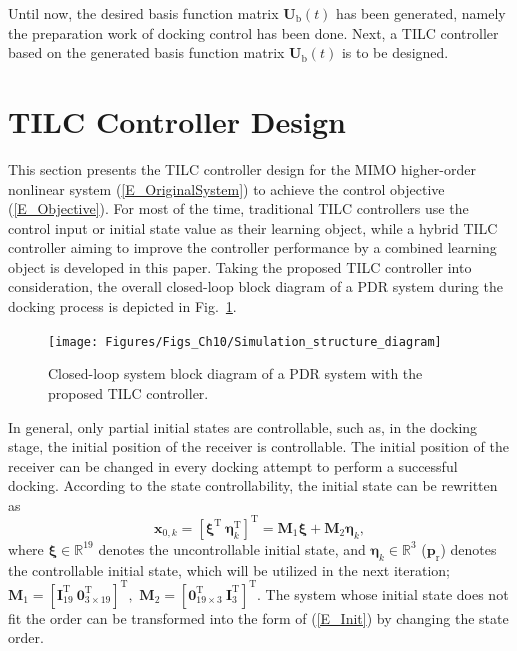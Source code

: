 Until now, the desired basis function matrix $\mathbf{U}_{\text{b}}\left(
t\right)  $ has been generated, namely the preparation work of docking control
has been done. Next, a TILC controller based on the generated basis function
matrix $\mathbf{U}_{\text{b}}\left(  t\right)  $ is to be designed.

\section{TILC Controller Design}

\label{TILC}

This section presents the TILC controller design for the MIMO higher-order
nonlinear system (\ref{E_OriginalSystem}) to achieve the control objective
(\ref{E_Objective}). For most of the time, traditional TILC controllers use
the control input or initial state value as their learning object, while a
hybrid TILC controller aiming to improve the controller performance by a
combined learning object is developed in this paper. Taking the proposed TILC
controller into consideration, the overall closed-loop block diagram of a PDR
system during the docking process is depicted in Fig.~\ref{Fig_SimStrDiagram}.
\begin{figure}[pth]
	\begin{centering}
		\texttt{[image: Figures/Figs\_Ch10/Simulation\_structure\_diagram]} 
		\par \end{centering}
	\caption{Closed-loop system block diagram of a PDR system with the proposed
		TILC controller.}%
	\label{Fig_SimStrDiagram}%
\end{figure}

In general, only partial initial states are controllable, such as, in the
docking stage, the initial position of the receiver is controllable. The
initial position of the receiver can be changed in every docking attempt to
perform a successful docking. According to the state controllability, the
initial state can be rewritten as
\begin{equation}
\mathbf{x}_{0,k}=\left[  \boldsymbol{\xi}^{\text{T}}\  \boldsymbol{\eta}%
_{k}^{\text{T}}\right]  ^{\text{T}}=\mathbf{M}_{1}\boldsymbol{\xi}%
+\mathbf{M}_{2}\boldsymbol{\eta}_{k}, \label{E_Init}%
\end{equation}
where $\boldsymbol{\xi}\in%
\mathbb{R}
^{19}$ denotes the uncontrollable initial state, and $\boldsymbol{\eta}_{k}\in%
\mathbb{R}
^{3}$ ($\mathbf{p}_{\text{r}}$) denotes the controllable initial state, which
will be utilized in the next iteration; $\mathbf{M}_{1}=\left[  \mathbf{I}%
_{19}^{\text{T}}\  \mathbf{0}_{3\times19}^{\text{T}}\right]  ^{\text{T}},$
$\mathbf{M}_{2}=\left[  \mathbf{0}_{19\times3}^{\text{T}}\  \mathbf{I}%
_{3}^{\text{T}}\right]  ^{\text{T}}$. The system whose initial state does not
fit the order can be transformed into the form of (\ref{E_Init}) by changing
the state order.

